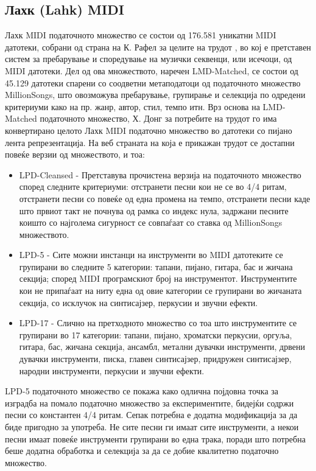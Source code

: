 \subsection{Лахк (Lahk) MIDI}

Лахк MIDI податочното множество се состои од 176.581 уникатни MIDI датотеки, собрани од страна на К. Рафел за целите на трудот \cite{Raffel2016}, во кој е претставен систем за пребарување и споредување на музички секвенци, или исечоци, од MIDI датотеки. Дел од ова множеството, наречен LMD-Matched, се состои од 45.129 датотеки спарени со соодветни метаподатоци од податочното множество MillionSongs, што овозможува пребарување, групирање и селекција по одредени критериуми како на пр. жанр, автор, стил, темпо итн. 
Врз основа на LMD-Matched податочното множество, Х. Донг за потребите на трудот \cite{Dong2017} го има конвертирано целото Лахк MIDI податочно множество во датотеки со пијано лента репрезентација. На веб страната на која е прикажан трудот се достапни повеќе верзии од множеството, и тоа:

\begin{itemize}
    \item LPD-Cleansed - Претставува прочистена верзија на податочното множество според следните критериуми: отстранети песни кои не се во 4/4 ритам, отстранети песни со повеќе од една промена на темпо, отстранети песни каде што првиот такт не почнува од рамка со индекс нула, задржани песните коишто со најголема сигурност се совпаѓаат со ставка од MillionSongs множеството.
    \item LPD-5 - Сите можни инстанци на инструменти во MIDI датотеките се групирани во следните 5 категории: тапани, пијано, гитара, бас и жичана секција; според MIDI програмскиот број на инструментот. Инструментите кои не припаѓаат на ниту една од овие категории се групирани во жичаната секција, со исклучок на синтисајзер, перкусии и звучни ефекти.
    \item LPD-17 - Слично на претходното множество со тоа што инструментите се групирани во 17 категории: тапани, пијано, хроматски перкусии, оргуља, гитара, бас, жичана секција, ансамбл, метални дувачки инструменти, дрвени дувачки инструменти, писка, главен синтисајзер, придружен синтисајзер, народни инструменти, перкусии и звучни ефекти.
\end{itemize}

LPD-5 податочното множество се покажа како одлична појдовна точка за изградба на помало податочно множество за експериментите, бидејќи содржи песни со константен 4/4 ритам. Сепак потребна е додатна модификација за да биде пригодно за употреба. Не сите песни ги имаат сите инструменти, а некои песни имаат повеќе инструменти групирани во една трака, поради што потребна беше додатна обработка и селекција за да се добие квалитетно податочно множество.

